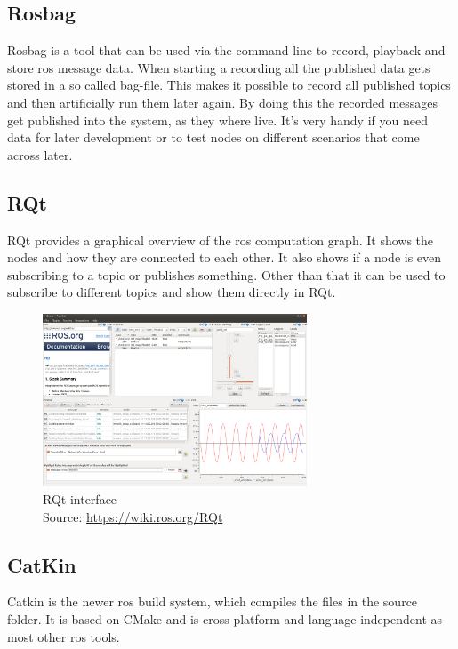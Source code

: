 \subsection{Rosbag}
Rosbag is a tool that can be used via the command line to record, playback and store \gls{ros} message data. When starting a recording all the published data gets stored in a so called bag-file. This makes it possible to record all published topics and then artificially run them later again. By doing this the recorded messages get published into the system, as they where live. It's very handy if you need data for later development or to test nodes on different scenarios that come across later.

\subsection{RQt}\label{rqt}
RQt provides a graphical overview of the \gls{ros} computation graph. It shows the nodes and how they are connected to each other. It also shows if a node is even subscribing to a topic or publishes something. Other than that it can be used to subscribe to different topics and show them directly in RQt.\newline
\begin{figure}[h]
	\centering
	\includegraphics[width=0.7\textwidth]{./media/images/RQt}
  	\caption{RQt interface\\Source: \url{https://wiki.ros.org/RQt}}
  	\label{rqtinterface}
\end{figure}

\subsection{CatKin}\label{catkin}
Catkin is the newer \gls{ros} build system, which compiles the files in the source folder. It is based on CMake and is cross-platform and language-independent as most other \gls{ros} tools.

